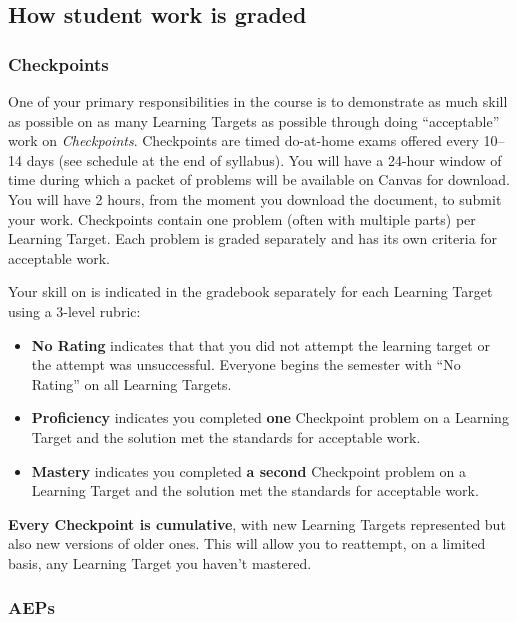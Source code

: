 \hypertarget{grading}{%
\subsection{How student work is graded}\label{grading}}

\hypertarget{checkpoints}{%
\subsubsection{Checkpoints}\label{checkpoints}}

One of your primary responsibilities in the course is to demonstrate as
much skill as possible on as many Learning Targets as possible through
doing ``acceptable'' work on \emph{Checkpoints}. Checkpoints are timed
do-at-home exams offered every 10--14 days (see schedule at the end of
syllabus). You will have a 24-hour window of time during which a packet
of problems will be available on Canvas for download. You will have 2
hours, from the moment you download the document, to submit your work.
Checkpoints contain one problem (often with multiple parts) per Learning
Target. Each problem is graded separately and has its own criteria for
acceptable work.

Your skill on is indicated in the gradebook separately for each Learning
Target using a 3-level rubric:

\begin{itemize}
\tightlist
\item
  \textbf{No Rating} indicates that that you did not attempt the
  learning target or the attempt was unsuccessful. Everyone begins the
  semester with ``No Rating'' on all Learning Targets.
\item
  \textbf{Proficiency} indicates you completed \textbf{one} Checkpoint
  problem on a Learning Target and the solution met the standards for
  acceptable work.
\item
  \textbf{Mastery} indicates you completed \textbf{a second} Checkpoint
  problem on a Learning Target and the solution met the standards for
  acceptable work.
\end{itemize}

\textbf{Every Checkpoint is cumulative}, with new Learning Targets
represented but also new versions of older ones. This will allow you to
reattempt, on a limited basis, any Learning Target you haven't mastered.

\hypertarget{aeps}{%
\subsubsection{AEPs}\label{aeps}}

